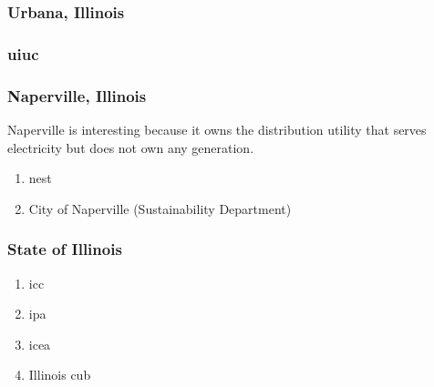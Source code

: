 \subsubsection{Urbana, Illinois}
\subsubsection{\acf{uiuc}}
\subsubsection{Naperville, Illinois}
Naperville is interesting because it owns the distribution utility that serves electricity
but does not own any generation.
\begin{enumerate}
    \item \ac{nest}
    \item City of Naperville (Sustainability Department)
\end{enumerate}
\subsubsection{State of Illinois}
\begin{enumerate}
    \item \ac{icc}
    \item \ac{ipa}
    \item \ac{icea}
    \item Illinois \ac{cub}
\end{enumerate}








